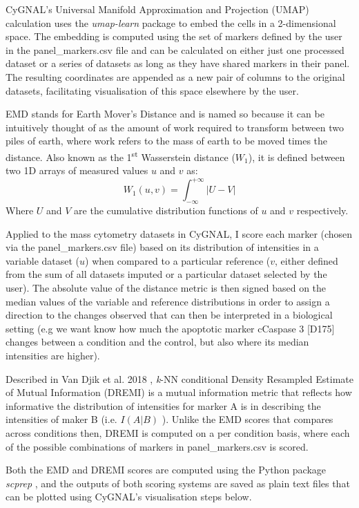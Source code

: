 CyGNAL’s Universal Manifold Approximation and Projection (UMAP) calculation uses the \emph{umap-learn} package \cite{mcinnes_umap_2020} to embed the cells in a 2-dimensional space. The embedding is computed using the set of markers defined by the user in the panel\_markers.csv file and can be calculated on either just one processed dataset or a series of datasets as long as they have shared markers in their panel. The resulting coordinates are appended as a new pair of columns to the original datasets, facilitating visualisation of this space elsewhere by the user.

EMD stands for Earth Mover's Distance and is named so because it can be intuitively thought of as the amount of work required to transform between two piles of earth, where work refers to the mass of earth to be moved times the distance. Also known as the 1\textsuperscript{st} Wasserstein distance (\(W_1\)), it is defined between two 1D arrays of measured values \(u\) and \(v\) as:
\[W_1(u, v) = \int_{-\infty}^{+\infty} |U-V|\]
Where \(U\) and \(V\) are the cumulative distribution functions of \(u\) and \(v\) respectively.

Applied to the mass cytometry datasets in CyGNAL, I score each marker (chosen via the panel\_markers.csv file) based on its distribution of intensities in a variable dataset (\(u\)) when compared to a particular reference (\(v\), either defined from the sum of all datasets imputed or a particular dataset selected by the user). The absolute value of the distance metric is then signed based on the median values of the variable and reference distributions in order to assign a direction to the changes observed that can then be interpreted in a biological setting (e.g we want know how much the apoptotic marker cCaspase 3 [D175] changes between a condition and the control, but also where its median intensities are higher).

Described in Van Djik et al. 2018 \cite{van_dijk_recovering_2018}, \emph{k}-NN conditional Density Resampled Estimate of Mutual Information (DREMI) is a mutual information metric that reflects how informative the distribution of intensities for marker A is in describing the intensities of maker B (i.e. \(I(A|B)\) ). Unlike the EMD scores that compares across conditions then, DREMI is computed on a per condition basis, where each of the possible combinations of markers in panel\_markers.csv is scored.

Both the EMD and DREMI scores are computed using the Python package \emph{scprep} \cite{noauthor_krishnaswamylabscprep_2021}, and the outputs of both scoring systems are saved as plain text files that can be plotted using CyGNAL’s visualisation steps below.

